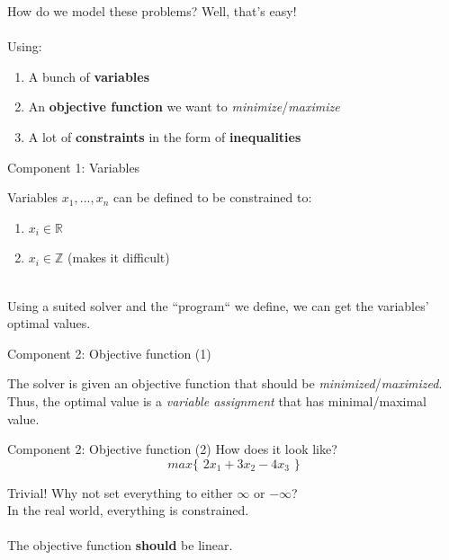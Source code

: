 \documentclass[10pt]{beamer}
\newcommand{\primaryColorB}[1]{\textcolor{mpigreen}{\textbf{#1}}}
\newcommand{\q}[1]{``#1``}
\newcommand{\curlO}{\{\,\,}
\newcommand{\curlC}{\,\,\}}
\begin{document}
\begin{frame}{How do we model these problems?}
Well, that's easy!\\\,\\

Using:
\begin{enumerate}
	\item A bunch of \primaryColorB{variables}
	\item An \primaryColorB{objective function} we want to \textit{minimize}/\textit{maximize}
	\item A lot of \primaryColorB{constraints} in the form of \primaryColorB{inequalities}
\end{enumerate}

\end{frame}


\begin{frame}{Component 1: Variables}

Variables $x_1, ..., x_n$ can be defined to be constrained to:
\begin{enumerate}
	\item $x_i\in \mathbb{R}$
	\item $x_i\in \mathbb{Z}$ (makes it difficult)
\end{enumerate}
\,\\
Using a suited solver and the \q{program} we define, we can get the variables' optimal values.
\end{frame}

\begin{frame}{Component 2: Objective function (1)}

The solver is given an objective function that should be \textit{minimized}/\textit{maximized}.\\
Thus, the optimal value is a \textit{variable assignment} that has minimal/maximal value.\\

\end{frame}

\begin{frame}{Component 2: Objective function (2)}
How does it look like?\\

\begin{equation}
	max \curlO 2x_1 + 3x_2 - 4x_3\curlC
\end{equation}

Trivial! Why not set everything to either $\infty$ or $-\infty$?\\
In the real world, everything is constrained.\\\,\\

The objective function \primaryColorB{should} be linear.

\end{frame}
\end{document}
